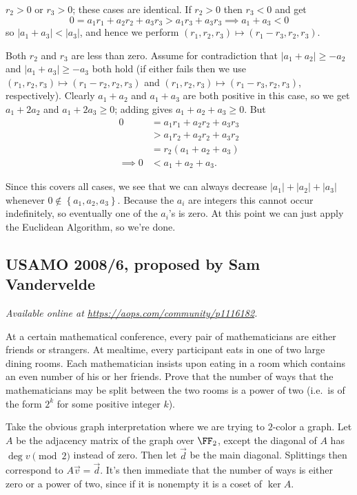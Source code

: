 \documentclass[11pt]{scrartcl}
\begin{document}
\begin{itemize}
  \ii $r_2 > 0$ or $r_3 > 0$; these cases are identical.
  If $r_2 > 0$ then $r_3 < 0$ and get
  \[ 0 = a_1r_1 + a_2r_2 + a_3r_3 > a_1r_3 + a_3r_3 \implies a_1 + a_3 < 0 \]
  so $\left\lvert a_1 + a_3 \right\rvert < \left\lvert a_3 \right\rvert$,
  and hence we perform $(r_1,r_2,r_3) \mapsto (r_1-r_3,r_2,r_3)$.

  \ii Both $r_2$ and $r_3$ are less than zero.
  Assume for contradiction that
  $\left\lvert a_1+a_2 \right\rvert \ge -a_2$
  and $\left\lvert a_1+a_3 \right\rvert \ge -a_3$ both hold
  (if either fails then we use $(r_1,r_2,r_3) \mapsto (r_1-r_2,r_2,r_3)$
  and $(r_1,r_2,r_3) \mapsto (r_1-r_3,r_2,r_3)$, respectively).
  Clearly $a_1+a_2$ and $a_1+a_3$ are both positive in this case,
  so we get $a_1 + 2a_2$ and $a_1 + 2a_3 \ge 0$;
  adding gives $a_1+a_2+a_3 \ge 0$.
  But
  \begin{align*}
    0 &= a_1r_1 + a_2r_2 + a_3r_3 \\
    &> a_1r_2 + a_2r_2 + a_3r_2 \\
    &= r_2(a_1+a_2+a_3)  \\
    \implies 0 &< a_1+a_2+a_3.
  \end{align*}
\end{itemize}

Since this covers all cases,
we see that we can always decrease
$\left\lvert a_1 \right\rvert + \left\lvert a_2 \right\rvert + \left\lvert a_3 \right\rvert$
whenever $0 \notin \left\{ a_1,a_2,a_3 \right\}$.
Because the $a_i$ are integers this cannot occur indefinitely,
so eventually one of the $a_i$'s is zero.
At this point we can just apply the Euclidean Algorithm, so we're done.
\pagebreak

\subsection{USAMO 2008/6, proposed by Sam Vandervelde}
\textsl{Available online at \url{https://aops.com/community/p1116182}.}
\begin{mdframed}[style=mdpurplebox,frametitle={Problem statement}]
At a certain mathematical conference,
every pair of mathematicians are either friends or strangers.
At mealtime, every participant eats in one of two large dining rooms.
Each mathematician insists upon eating in a room which
contains an even number of his or her friends.
Prove that the number of ways that the mathematicians
may be split between the two rooms is a power of two
(i.e.\ is of the form $2^k$ for some positive integer $k$).
\end{mdframed}
Take the obvious graph interpretation
where we are trying to $2$-color a graph.
Let $A$ be the adjacency matrix of the graph over $\FF_2$,
except the diagonal of $A$ has $\deg v \pmod 2$ instead of zero.
Then let $\vec d$ be the main diagonal.
Splittings then correspond to $A \vec v = \vec d$.
It's then immediate that the number of ways is either zero
or a power of two, since if it is nonempty it is a coset of $\ker A$.
\end{document}
